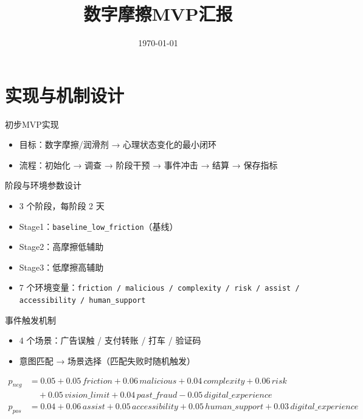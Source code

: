 \documentclass[aspectratio=169]{beamer}
\title[MVP Report]{数字摩擦MVP汇报}
\date{\today}
\begin{document}
\begin{frame}
    \titlepage
\end{frame}

\section{实现与机制设计}

\begin{frame}{初步MVP实现}
    \begin{itemize}
        \item 目标：数字摩擦/润滑剂 → 心理状态变化的最小闭环
        \item 流程：初始化 → 调查 → 阶段干预 → 事件冲击 → 结算 → 保存指标
    \end{itemize}

\end{frame}

\begin{frame}{阶段与环境参数设计}
    \begin{itemize}
        \item 3 个阶段，每阶段 2 天
        \item Stage1：\texttt{baseline\_low\_friction}（基线）
        \item Stage2：高摩擦低辅助
        \item Stage3：低摩擦高辅助
        \item 7 个环境变量：\texttt{friction / malicious / complexity / risk / assist / accessibility / human\_support}
    \end{itemize}

\end{frame}

\begin{frame}{事件触发机制}
    \begin{itemize}
        \item 4 个场景：广告误触 / 支付转账 / 打车 / 验证码
        \item 意图匹配 → 场景选择（匹配失败时随机触发）
    \end{itemize}

    \vspace{0.2cm}
    \begin{align*}
        p_{neg} &= 0.05
        + 0.05\,friction
        + 0.06\,malicious
        + 0.04\,complexity
        + 0.06\,risk \\
        &\quad + 0.05\,vision\_limit
        + 0.04\,past\_fraud
        - 0.05\,digital\_experience \\
        p_{pos} &= 0.04
        + 0.06\,assist
        + 0.05\,accessibility
        + 0.05\,human\_support
        + 0.03\,digital\_experience
    \end{align*}

\end{frame}
\end{document}
